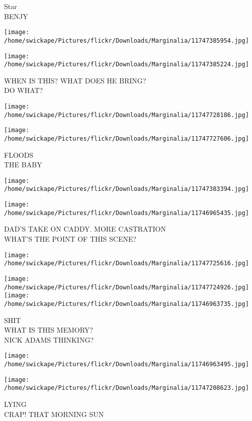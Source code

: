 \documentclass[10pt,letterpaper]{article}
\begin{document}
Star\\
BENJY
\pagebreak

\texttt{[image: /home/swickape/Pictures/flickr/Downloads/Marginalia/11747385954.jpg]}

\vspace{0.25in}
\texttt{[image: /home/swickape/Pictures/flickr/Downloads/Marginalia/11747385224.jpg]}

WHEN IS THIS? WHAT DOES HE BRING?\\
DO WHAT?
\pagebreak

\texttt{[image: /home/swickape/Pictures/flickr/Downloads/Marginalia/11747728186.jpg]}

\vspace{0.25in}
\texttt{[image: /home/swickape/Pictures/flickr/Downloads/Marginalia/11747727606.jpg]}

FLOODS\\
THE BABY
\pagebreak

\texttt{[image: /home/swickape/Pictures/flickr/Downloads/Marginalia/11747383394.jpg]}

\vspace{0.25in}
\texttt{[image: /home/swickape/Pictures/flickr/Downloads/Marginalia/11746965435.jpg]}

DAD'S TAKE ON CADDY.  MORE CASTRATION\\
WHAT'S THE POINT OF THIS SCENE?
\pagebreak

\texttt{[image: /home/swickape/Pictures/flickr/Downloads/Marginalia/11747725616.jpg]}

\vspace{0.25in}
\texttt{[image: /home/swickape/Pictures/flickr/Downloads/Marginalia/11747724926.jpg]}
\texttt{[image: /home/swickape/Pictures/flickr/Downloads/Marginalia/11746963735.jpg]}

SHIT\\
WHAT IS THIS MEMORY?\\
NICK ADAMS THINKING?
\pagebreak

\texttt{[image: /home/swickape/Pictures/flickr/Downloads/Marginalia/11746963495.jpg]}

\vspace{0.25in}
\texttt{[image: /home/swickape/Pictures/flickr/Downloads/Marginalia/11747208623.jpg]}

LYING\\
CRAP! THAT MORNING SUN
\pagebreak
\end{document}
